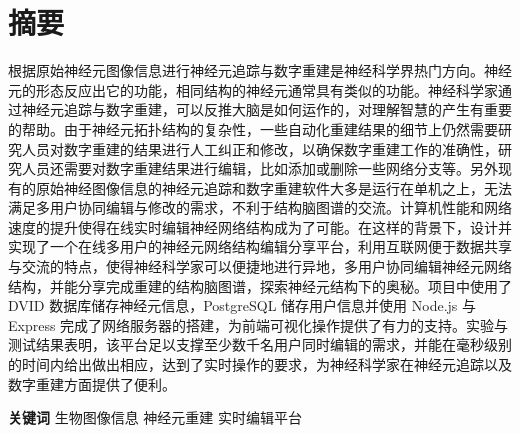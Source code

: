 \chapter{摘要}

根据原始神经元图像信息进行神经元追踪与数字重建是神经科学界热门方向。神经元的形态反应出它的功能，相同结构的神经元通常具有类似的功能。神经科学家通过神经元追踪与数字重建，可以反推大脑是如何运作的，对理解智慧的产生有重要的帮助。由于神经元拓扑结构的复杂性，一些自动化重建结果的细节上仍然需要研究人员对数字重建的结果进行人工纠正和修改，以确保数字重建工作的准确性，研究人员还需要对数字重建结果进行编辑，比如添加或删除一些网络分支等。另外现有的原始神经图像信息的神经元追踪和数字重建软件大多是运行在单机之上，无法满足多用户协同编辑与修改的需求，不利于结构脑图谱的交流。计算机性能和网络速度的提升使得在线实时编辑神经网络结构成为了可能。在这样的背景下，设计并实现了一个在线多用户的神经元网络结构编辑分享平台，利用互联网便于数据共享与交流的特点，使得神经科学家可以便捷地进行异地，多用户协同编辑神经元网络结构，并能分享完成重建的结构脑图谱，探索神经元结构下的奥秘。项目中使用了 DVID 数据库储存神经元信息，PostgreSQL 储存用户信息并使用 Node.js 与 Express 完成了网络服务器的搭建，为前端可视化操作提供了有力的支持。实验与测试结果表明，该平台足以支撑至少数千名用户同时编辑的需求，并能在毫秒级别的时间内给出做出相应，达到了实时操作的要求，为神经科学家在神经元追踪以及数字重建方面提供了便利。

{
    \vspace{1em}
    \setlength{\parindent}{0em}
    \textbf{关键词} \; 生物图像信息 \; 神经元重建 \; 实时编辑平台 \par
}
